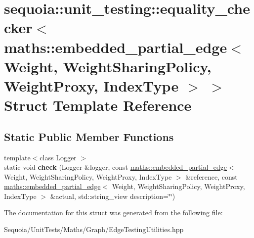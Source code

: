\hypertarget{structsequoia_1_1unit__testing_1_1equality__checker_3_01maths_1_1embedded__partial__edge_3_01_we0aa5b267b11d87f3d940ebad04deb519}{}\section{sequoia\+::unit\+\_\+testing\+::equality\+\_\+checker$<$ maths\+::embedded\+\_\+partial\+\_\+edge$<$ Weight, Weight\+Sharing\+Policy, Weight\+Proxy, Index\+Type $>$ $>$ Struct Template Reference}
\label{structsequoia_1_1unit__testing_1_1equality__checker_3_01maths_1_1embedded__partial__edge_3_01_we0aa5b267b11d87f3d940ebad04deb519}
\subsection*{Static Public Member Functions}
\begin{DoxyCompactItemize}
\item 
\mbox{\label{structsequoia_1_1unit__testing_1_1equality__checker_3_01maths_1_1embedded__partial__edge_3_01_we0aa5b267b11d87f3d940ebad04deb519_ab094b9b01269d12f085526083b08a003}} 
{\footnotesize template$<$class Logger $>$ }\\static void {\bfseries check} (Logger \&logger, const \mbox{\hyperlink{classsequoia_1_1maths_1_1embedded__partial__edge}{maths\+::embedded\+\_\+partial\+\_\+edge}}$<$ Weight, Weight\+Sharing\+Policy, Weight\+Proxy, Index\+Type $>$ \&reference, const \mbox{\hyperlink{classsequoia_1_1maths_1_1embedded__partial__edge}{maths\+::embedded\+\_\+partial\+\_\+edge}}$<$ Weight, Weight\+Sharing\+Policy, Weight\+Proxy, Index\+Type $>$ \&actual, std\+::string\+\_\+view description=\char`\"{}\char`\"{})
\end{DoxyCompactItemize}


The documentation for this struct was generated from the following file\+:\begin{DoxyCompactItemize}
\item 
Sequoia/\+Unit\+Tests/\+Maths/\+Graph/Edge\+Testing\+Utilities.\+hpp\end{DoxyCompactItemize}
